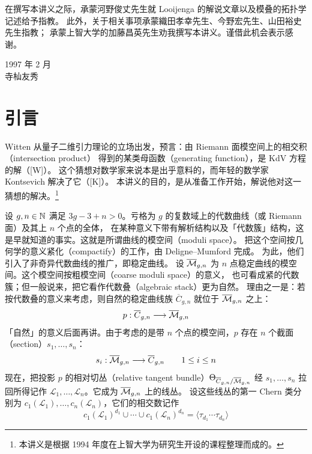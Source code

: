 在撰写本讲义之际，承蒙河野俊丈先生就 Looijenga 的解说文章以及模叠的拓扑学记述给予指教。
此外，关于相关事项承蒙織田孝幸先生、今野宏先生、山田裕史先生指教；
承蒙上智大学的加藤昌英先生劝我撰写本讲义。谨借此机会表示感谢。

\vspace{1.2em}
\begin{flushright}
1997 年 2 月\\
寺杣友秀
\end{flushright}


\section{引言}

Witten 从量子二维引力理论的立场出发，预言：由 Riemann 面模空间上的相交积（intersection product）
得到的某类母函数（generating function），是 KdV 方程的解（[W]）。
这个猜想对数学家来说本是出乎意料的，而年轻的数学家 Kontsevich 解决了它（[K]）。
本讲义的目的，是从准备工作开始，解说他对这一猜想的解决。\footnote{本讲义是根据 1994 年度在上智大学为研究生开设的课程整理而成的。}

设 $g,n\in\mathbb{N}$ 满足 $3g-3+n>0$。亏格为 $g$ 的复数域上的代数曲线（或 Riemann 面）及其上 $n$ 个点的全体，
在某种意义下带有解析结构以及「代数簇」结构，这是早就知道的事实。这就是所谓曲线的模空间（moduli space）。
把这个空间按几何学的意义紧化（compactify）的工作，由 Deligne--Mumford 完成。
为此，他们引入了非奇异代数曲线的推广，即稳定曲线。
设 $\overline{\mathcal{M}}_{g,n}$ 为 $n$ 点稳定曲线的模空间。这个模空间按粗模空间（coarse moduli space）的意义，
也可看成紧的代数簇；但一般说来，把它看作代数叠（algebraic stack）更为自然。
理由之一是：若按代数叠的意义来考虑，则自然的稳定曲线族 $\overline{C}_{g,n}$ 就位于 $\overline{\mathcal{M}}_{g,n}$ 之上：
\[
p:\overline{C}_{g,n}\longrightarrow\overline{\mathcal{M}}_{g,n}
\]
「自然」的意义后面再讲。由于考虑的是带 $n$ 个点的模空间，$p$ 存在 $n$ 个截面（section）$s_1,\dots,s_n$：
\[
s_i:\overline{\mathcal{M}}_{g,n}\longrightarrow\overline{C}_{g,n}\qquad 1\le i\le n
\]
现在，把投影 $p$ 的相对切丛（relative tangent bundle）$\Theta_{\overline{C}_{g,n}/\overline{\mathcal{M}}_{g,n}}$
经 $s_1,\dots,s_n$ 拉回所得记作 $\mathcal{L}_1,\dots,\mathcal{L}_n$。它成为 $\overline{\mathcal{M}}_{g,n}$ 上的线丛。
设这些线丛的第一 Chern 类分别为 $c_1(\mathcal{L}_1),\dots,c_n(\mathcal{L}_n)$，它们的相交数记作
\[
c_1(\mathcal{L}_1)^{d_1}\cup\cdots\cup c_1(\mathcal{L}_n)^{d_n}=\langle\tau_{d_1}\cdots\tau_{d_n}\rangle
\]


